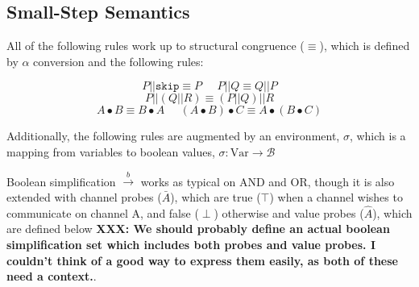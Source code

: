 \documentclass[times,10pt]{article}
\begin{document}
\subsection{Small-Step Semantics}

All of the following rules work up to structural congruence ($\equiv$), which is defined by $\alpha$ conversion and the following rules:

\[
P || \mathtt{skip} \equiv P \;\;\;\;\;  P || Q \equiv Q || P %
\]
\[
P || (Q || R) \equiv (P || Q) || R 
\]
\[
A \bullet B \equiv B \bullet A \;\;\;\;\; ( A \bullet B ) \bullet C \equiv A \bullet ( B \bullet C )
\]

Additionally, the following rules are augmented by an environment, $\sigma$, which is a mapping from variables to boolean values, $\sigma : \textrm{Var} \rightarrow \mathcal{B}$ 

Boolean simplification $\overset{b}{\rightarrow}$ works as typical on AND and OR, though it is also extended with channel probes ($\bar{A}$), which are true  ($\top$) when a channel wishes to communicate on channel A, and false ($\perp$) otherwise and value probes ($\widehat{A}$), which are defined below \textbf{XXX: We should probably define an actual boolean simplification set which includes both probes and value probes.  I couldn't think of a good way to express them easily, as both of these need a context.}.
\end{document}
